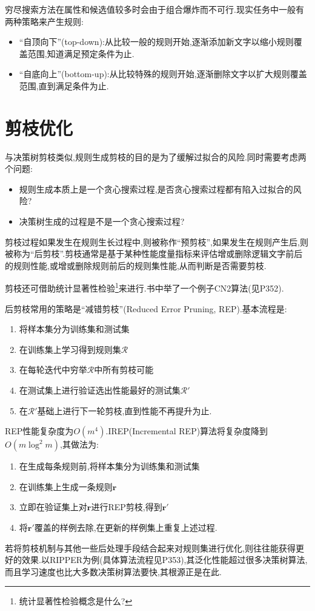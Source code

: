 穷尽搜索方法在属性和候选值较多时会由于组合爆炸而不可行.现实任务中一般有两种策略来产生规则:
\begin{itemize}
\item ``自顶向下''(top-down):从比较一般的规则开始,逐渐添加新文字以缩小规则覆盖范围,知道满足预定条件为止.
\item ``自底向上''(bottom-up):从比较特殊的规则开始,逐渐删除文字以扩大规则覆盖范围,直到满足条件为止.
\end{itemize}

\section{剪枝优化}

与决策树剪枝类似,规则生成剪枝的目的是为了缓解过拟合的风险.同时需要考虑两个问题:
\begin{itemize}
\item 规则生成本质上是一个贪心搜索过程,是否贪心搜索过程都有陷入过拟合的风险?
\item 决策树生成的过程是不是一个贪心搜索过程?
\end{itemize}

剪枝过程如果发生在规则生长过程中,则被称作``预剪枝'',如果发生在规则产生后,则被称为``后剪枝''.剪枝通常是基于某种性能度量指标来评估增或删除逻辑文字前后的规则性能,或增或删除规则前后的规则集性能,从而判断是否需要剪枝.

剪枝还可借助统计显著性检验\footnote{统计显著性检验概念是什么?}来进行.书中举了一个例子CN2算法(见P352).

后剪枝常用的策略是``减错剪枝''(Reduced Error Pruning, REP).基本流程是:
\begin{enumerate}
\item 将样本集分为训练集和测试集
\item 在训练集上学习得到规则集$\mathcal R$
\item 在每轮迭代中穷举$\mathcal R$中所有剪枝可能
\item 在测试集上进行验证选出性能最好的测试集$\mathcal R'$
\item 在$\mathcal R'$基础上进行下一轮剪枝,直到性能不再提升为止.
\end{enumerate}

REP性能复杂度为$O(m^4)$.IREP(Incremental REP)算法将复杂度降到$O(m\log^2m)$,其做法为:
\begin{enumerate}
\item 在生成每条规则前,将样本集分为训练集和测试集
\item 在训练集上生成一条规则$\mathbf r$
\item 立即在验证集上对$\mathbf r$进行REP剪枝,得到$\mathbf r'$
\item 将$\mathbf r'$覆盖的样例去除,在更新的样例集上重复上述过程.
\end{enumerate}
若将剪枝机制与其他一些后处理手段结合起来对规则集进行优化,则往往能获得更好的效果.以RIPPER为例(具体算法流程见P353),其泛化性能超过很多决策树算法,而且学习速度也比大多数决策树算法要快,其根源正是在此.

